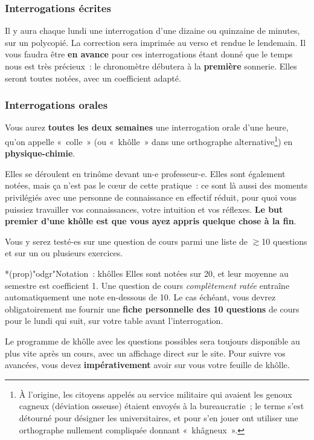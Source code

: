 \documentclass[a4paper, 10pt, garamond]{book}
\begin{document}
\subsubsection{Interrogations écrites}
Il y aura chaque lundi une interrogation d'une dizaine ou quinzaine de minutes,
sur un polycopié. La correction sera imprimée au verso et rendue le lendemain.
Il vous faudra être \textbf{en avance} pour ces interrogations étant donné que
le temps nous est très précieux~: le chronomètre débutera à la \textbf{première}
sonnerie. Elles seront toutes notées, avec un coefficient adapté.

\subsubsection{Interrogations orales}
Vous aurez \textbf{toutes les deux semaines} une interrogation orale d'une
heure, qu'on appelle «~colle~» (ou «~khôlle~» dans une orthographe
alternative\footnote{À l'origine, les citoyens appelés au service militaire qui
	avaient les genoux cagneux (déviation osseuse) étaient envoyés à la
	bureaucratie~; le terme s'est détourné pour désigner les universitaires, et pour
	s'en jouer ont utiliser une orthographe nullement compliquée donnant
	«~khâgneux~».}) en \textbf{physique-chimie}.

Elles se déroulent en trinôme devant un-e professeur-e. Elles sont également
notées, mais ça n'est pas le cœur de cette pratique~: ce sont là aussi des
moments privilégiés avec une personne de connaissance en effectif réduit, pour
quoi vous puissiez travailler vos connaissances, votre intuition et vos
réflexes. \textbf{Le but premier d'une khôlle est que vous ayez appris quelque
	chose à la fin}.

Vous y serez testé-es sur une question de cours parmi une liste de $\gtrsim$10
questions et sur un ou plusieurs exercices.
\begin{tcn}*(prop)"odgr"{Notation~: khôlles}
	Elles sont notées sur 20, et leur moyenne au semestre est coefficient 1.
	\smallbreak
	Une question de cours \textit{complètement ratée} entraîne automatiquement une
	note en-dessous de 10. Le cas échéant, vous devrez obligatoirement me fournir
	une \textbf{fiche personnelle des 10 questions} de cours pour le lundi qui
	suit, sur votre table avant l'interrogation.
\end{tcn}
Le programme de khôlle avec les questions possibles sera
toujours disponible au plus vite après un cours, avec un affichage direct sur le
site. Pour suivre vos avancées, vous devez \textbf{impérativement} avoir sur
vous votre feuille de khôlle.
\end{document}
